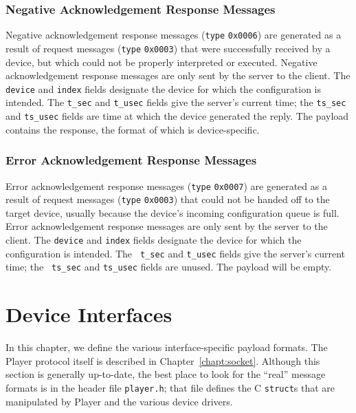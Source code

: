 \documentclass[11pt]{report}
\newcommand{\newinterface}{\newpage}
\begin{document}
\subsection{Negative Acknowledgement Response Messages}
\label{sect:nack-responsemessages}
Negative acknowledgement response messages ({\tt type} {\tt 0x0006})
are generated as a result of request messages ({\tt type} {\tt 0x0003})
that were successfully received by a device, but which could not be properly
interpreted or executed.  Negative acknowledgement response messages are only
sent by the server to the client.  The {\tt device} and {\tt index} fields
designate the device for which the configuration is intended.  The {\tt t\_sec}
and {\tt t\_usec} fields give the server's current time; the {\tt ts\_sec}
and {\tt ts\_usec} fields are time at which the device generated the reply.
The payload contains the response, the format of which is device-specific.

\subsection{Error Acknowledgement Response Messages}
\label{sect:error-responsemessages}
Error acknowledgement response messages ({\tt type} {\tt 0x0007}) are
generated as a result of request messages ({\tt type} {\tt 0x0003}) that
could not be handed off to the target device, usually because the device's
incoming configuration queue is full.  Error acknowledgement response messages
are only sent by the server to the client.  The {\tt device} and {\tt index}
fields designate the device for which the configuration is intended.  The {\tt
t\_sec} and {\tt t\_usec} fields give the server's current time; the {\tt
ts\_sec} and {\tt ts\_usec} fields are unused.  The payload will be empty.
\chapter{Device Interfaces}
\label{chapt:interfaces}

In this chapter, we define the various interface-specific payload formats.
The Player protocol itself is described in Chapter~\ref{chapt:socket}.
Although this section is generally up-to-date, the best place to look
for the ``real'' message formats is in the header file 
{\tt player.h}; that file defines the C {\tt struct}s that
are manipulated by Player and the various device drivers.

\newinterface

\end{document}
